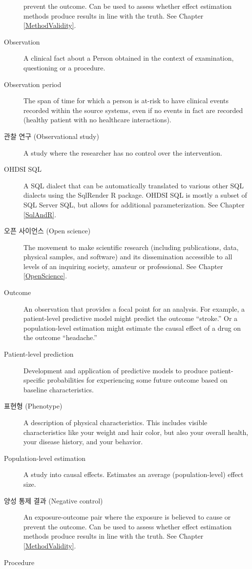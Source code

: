 \documentclass[11pt]{book}
\theoremstyle{definition}
\theoremstyle{definition}
\theoremstyle{definition}
\theoremstyle{remark}
\begin{document}
\begin{description}
prevent the outcome. Can be used to assess whether effect estimation
methods produce results in line with the truth. See Chapter
\ref{MethodValidity}.
\item[Observation]
A clinical fact about a Person obtained in the context of examination,
questioning or a procedure.
\item[Observation period]
The span of time for which a person is at-risk to have clinical events
recorded within the source systems, even if no events in fact are
recorded (healthy patient with no healthcare interactions).
\item[관찰 연구 (Observational study)]
A study where the researcher has no control over the intervention.
\item[OHDSI SQL]
A SQL dialect that can be automatically translated to various other SQL
dialects using the SqlRender R package. OHDSI SQL is mostly a subset of
SQL Server SQL, but allows for additional parameterization. See Chapter
\ref{SqlAndR}.
\item[오픈 사이언스 (Open science)]
The movement to make scientific research (including publications, data,
physical samples, and software) and its dissemination accessible to all
levels of an inquiring society, amateur or professional. See Chapter
\ref{OpenScience}.
\item[Outcome]
An observation that provides a focal point for an analysis. For example,
a patient-level predictive model might predict the outcome ``stroke.''
Or a population-level estimation might estimate the causal effect of a
drug on the outcome ``headache.''
\item[Patient-level prediction]
Development and application of predictive models to produce
patient-specific probabilities for experiencing some future outcome
based on baseline characteristics.
\item[표현형 (Phenotype)]
A description of physical characteristics. This includes visible
characteristics like your weight and hair color, but also your overall
health, your disease history, and your behavior.
\item[Population-level estimation]
A study into causal effects. Estimates an average (population-level)
effect size.
\item[양성 통제 결과 (Negative control)]
An exposure-outcome pair where the exposure is believed to cause or
prevent the outcome. Can be used to assess whether effect estimation
methods produce results in line with the truth. See Chapter
\ref{MethodValidity}.
\item[Procedure]

\end{description}
\end{document}
